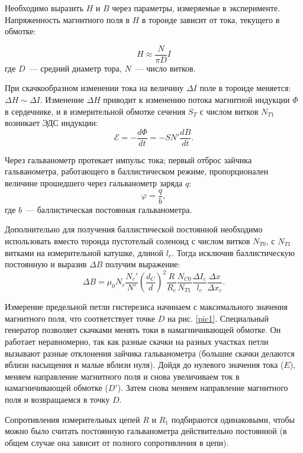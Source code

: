\documentclass[a4paper,14pt]{article}
\begin{document}
Необходимо выразить $H$ и $B$ через параметры, измеряемые в эксперименте.
Напряженность магнитного поля в $H$ в тороиде зависит от тока, текущего в обмотке: 

\begin{equation}
H \approx \dfrac{N}{\pi D} I
\label{eqH}
\end{equation}
где $D$~--- средний диаметр тора, $N$~--- число витков.

При скачкообразном изменении тока на величину $\Delta I$ поле в тороиде меняется: $\Delta H \sim \Delta I$. Изменение $\Delta H$ приводит к изменению потока магнитной индукции $\Phi$ в сердечнике, и в измерительной обмотке сечения $S_T$ с числом витков $N_{T1}$ возникает ЭДС индукции:
$$ \mathcal{E} = - \dfrac{d \Phi}{dt} = - S N' \dfrac{dB}{dt}.$$

Через гальванометр протекает импульс тока; первый отброс зайчика гальванометра, работающего в баллистическом режиме, пропорционален величине прошедшего через гальванометр заряда $q$:
$$\varphi = \dfrac{q}{b},$$
где $b$~--- баллистическая постоянная гальванометра. 

Дополнительно для получения баллистической постоянной необходимо использовать вместо тороида пустотелый соленоид с числом витков $N_{T0}$, с $N_{T1}$ витками на измерительной катушке, длиной $l_c$. Тогда исключив баллистическую постоянную и выразив $\Delta B$ получим выражение: 
\begin{equation}
	\Delta B  = \mu_0 N_c \dfrac{N_c'}{N'} \left( \dfrac{d_C}{d} \right)^2 \dfrac{R}{R_c} \dfrac{N_{C0}}{N_{T1}} \dfrac{\Delta I_c}{l_c} \dfrac{\Delta x}{\Delta x_c}.
	\label{eq1}
\end{equation}

Измерение предельной петли гистерезиса начинаем с максимального значения магнитного поля, что соответствует точке $D$ на рис. \ref{pic1}. Специальный генератор позволяет скачками менять токи в намагничивающей обмотке. Он работает неравномерно, так как разные скачки на разных участках петли вызывают разные отклонения зайчика гальванометра (большие скачки делаются вблизи насыщения и малые вблизи нуля). Дойдя до нулевого значения тока ($E$), меняем направление магнитного поля и снова увеличиваем ток в намагничивающей обмотке ($D'$). Затем снова меняем направление магнитного поля и возвращаемся в точку $D$.

Сопротивления измерительных цепей $R$ и $R_1$ подбираются одинаковыми, чтобы можно было считать постоянную гальванометра действительно постоянной (в общем случае она зависит от полного сопротивления в цепи).
\end{document}
